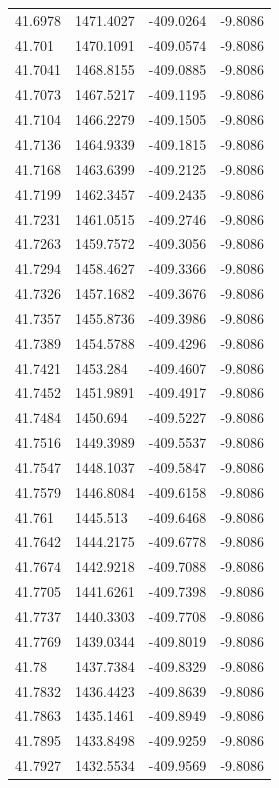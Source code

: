 \begin{table}[H]
\begin{tabular}{llll}
41.6978 & 1471.4027 & -409.0264 & -9.8086 \\
41.701 & 1470.1091 & -409.0574 & -9.8086 \\
41.7041 & 1468.8155 & -409.0885 & -9.8086 \\
41.7073 & 1467.5217 & -409.1195 & -9.8086 \\
41.7104 & 1466.2279 & -409.1505 & -9.8086 \\
41.7136 & 1464.9339 & -409.1815 & -9.8086 \\
41.7168 & 1463.6399 & -409.2125 & -9.8086 \\
41.7199 & 1462.3457 & -409.2435 & -9.8086 \\
41.7231 & 1461.0515 & -409.2746 & -9.8086 \\
41.7263 & 1459.7572 & -409.3056 & -9.8086 \\
41.7294 & 1458.4627 & -409.3366 & -9.8086 \\
41.7326 & 1457.1682 & -409.3676 & -9.8086 \\
41.7357 & 1455.8736 & -409.3986 & -9.8086 \\
41.7389 & 1454.5788 & -409.4296 & -9.8086 \\
41.7421 & 1453.284 & -409.4607 & -9.8086 \\
41.7452 & 1451.9891 & -409.4917 & -9.8086 \\
41.7484 & 1450.694 & -409.5227 & -9.8086 \\
41.7516 & 1449.3989 & -409.5537 & -9.8086 \\
41.7547 & 1448.1037 & -409.5847 & -9.8086 \\
41.7579 & 1446.8084 & -409.6158 & -9.8086 \\
41.761 & 1445.513 & -409.6468 & -9.8086 \\
41.7642 & 1444.2175 & -409.6778 & -9.8086 \\
41.7674 & 1442.9218 & -409.7088 & -9.8086 \\
41.7705 & 1441.6261 & -409.7398 & -9.8086 \\
41.7737 & 1440.3303 & -409.7708 & -9.8086 \\
41.7769 & 1439.0344 & -409.8019 & -9.8086 \\
41.78 & 1437.7384 & -409.8329 & -9.8086 \\
41.7832 & 1436.4423 & -409.8639 & -9.8086 \\
41.7863 & 1435.1461 & -409.8949 & -9.8086 \\
41.7895 & 1433.8498 & -409.9259 & -9.8086 \\
41.7927 & 1432.5534 & -409.9569 & -9.8086 \\

\end{tabular}
\end{table}
